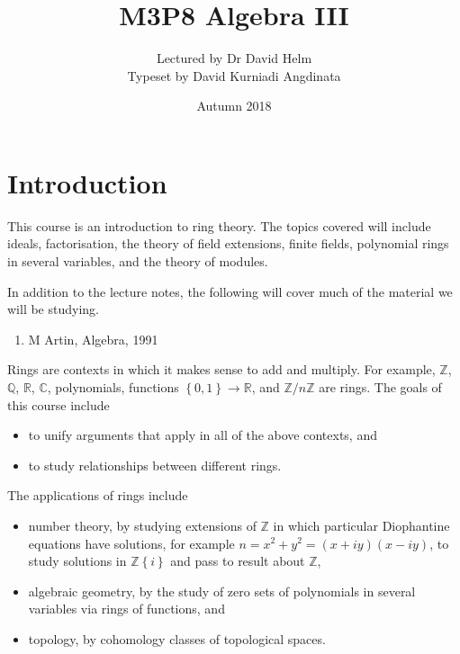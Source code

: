 \documentclass{article}
\title{M3P8 Algebra III}
\author{Lectured by Dr David Helm \\ Typeset by David Kurniadi Angdinata}
\date{Autumn 2018}
\newcommand{\Z}{\mathbb{Z}}
\newcommand{\Q}{\mathbb{Q}}
\newcommand{\R}{\mathbb{R}}
\newcommand{\C}{\mathbb{C}}
\newcommand{\rb}[1]{\left( #1 \right)}
\newcommand{\cb}[1]{\left\{ #1 \right\}}
\theoremstyle{definition}\newtheorem{definition}{Definition}[subsection]
\theoremstyle{definition}\newtheorem{remark}[definition]{Remark}
\theoremstyle{definition}\newtheorem*{example}{Example}
\theoremstyle{definition}\newtheorem*{note}{Note}
\begin{document}
\maketitle

\vfill

\tableofcontents

\pagebreak


\section{Introduction}

This course is an introduction to ring theory. The topics covered will include ideals, factorisation, the theory of field extensions, finite fields, polynomial rings in several variables, and the theory of modules.

In addition to the lecture notes, the following will cover much of the material we will be studying.

\begin{enumerate}
\item M Artin, Algebra, 1991
\end{enumerate}

Rings are contexts in which it makes sense to add and multiply. For example, $ \Z $, $ \Q $, $ \R $, $ \C $, polynomials, functions $ \cb{0, 1} \to \R $, and $ \Z / n\Z $ are rings. The goals of this course include
\begin{itemize}
\item to unify arguments that apply in all of the above contexts, and
\item to study relationships between different rings.
\end{itemize}
The applications of rings include
\begin{itemize}
\item number theory, by studying extensions of $ \Z $ in which particular Diophantine equations have solutions, for example $ n = x^2 + y^2 = \rb{x + iy}\rb{x - iy} $, to study solutions in $ \Z\cb{i} $ and pass to result about $ \Z $,
\item algebraic geometry, by the study of zero sets of polynomials in several variables via rings of functions, and
\item topology, by cohomology classes of topological spaces.
\end{itemize}
\end{document}
